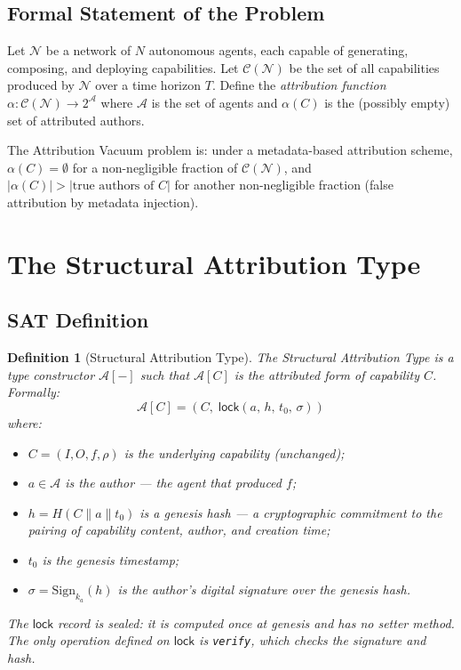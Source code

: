 \documentclass[12pt]{article}
\newtheorem{definition}[theorem]{Definition}
\newcommand{\ATTR}{\mathcal{A}}
\newcommand{\LOCK}{\mathsf{lock}}
\begin{document}
\subsection{Formal Statement of the Problem}

Let $\mathcal{N}$ be a network of $N$ autonomous agents, each capable of
generating, composing, and deploying capabilities.  Let $\mathcal{C}(\mathcal{N})$
be the set of all capabilities produced by $\mathcal{N}$ over a time horizon
$T$.  Define the \emph{attribution function}
$\alpha : \mathcal{C}(\mathcal{N}) \to 2^\mathcal{A}$
where $\mathcal{A}$ is the set of agents and $\alpha(C)$ is the (possibly empty)
set of attributed authors.

The Attribution Vacuum problem is: under a metadata-based attribution scheme,
$\alpha(C) = \emptyset$ for a non-negligible fraction of $\mathcal{C}(\mathcal{N})$,
and $|\alpha(C)| > |\text{true authors of } C|$ for another non-negligible
fraction (false attribution by metadata injection).

\section{The Structural Attribution Type}
\label{sec:sat}

\subsection{SAT Definition}

\begin{definition}[Structural Attribution Type]
  The \emph{Structural Attribution Type} is a type constructor $\ATTR[-]$ such
  that $\ATTR[C]$ is the attributed form of capability $C$.  Formally:
  \[
    \ATTR[C] = (C,\; \LOCK(a,\, h,\, t_0,\, \sigma))
  \]
  where:
  \begin{itemize}[leftmargin=*]
    \item $C = (I, O, f, \rho)$ is the underlying capability (unchanged);
    \item $a \in \mathcal{A}$ is the \emph{author} — the agent that produced $f$;
    \item $h = H(C \| a \| t_0)$ is a \emph{genesis hash} — a cryptographic
      commitment to the pairing of capability content, author, and creation time;
    \item $t_0$ is the \emph{genesis timestamp};
    \item $\sigma = \text{Sign}_{k_a}(h)$ is the author's digital signature
      over the genesis hash.
  \end{itemize}
  The $\LOCK$ record is \emph{sealed}: it is computed once at genesis and has no
  setter method.  The only operation defined on $\LOCK$ is \texttt{verify},
  which checks the signature and hash.
\end{definition}
\end{document}
